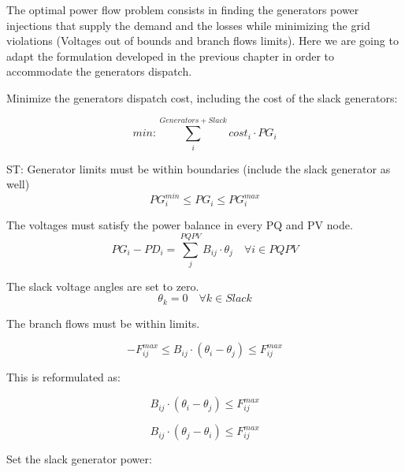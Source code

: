 \documentclass[nols,a4paper,twoside,notoc,fleqn]{tufte-book}
\begin{document}
The optimal power flow problem consists in finding the generators power injections that supply the demand and the losses while minimizing the grid violations (Voltages out of bounds and branch flows limits). Here we are going to adapt the formulation developed in the previous chapter in order to accommodate the generators dispatch.

Minimize the generators dispatch cost, including the cost of the slack generators:

\begin{equation}
min: \sum_i^{Generators+Slack} cost_i \cdot PG_i 
\end{equation}

ST: 
Generator limits must be within boundaries (include the slack generator as well)
\begin{equation}
PG_i^{min} \leq PG_i \leq PG_i^{max}
\end{equation}


The voltages must satisfy the power balance in every PQ and PV node.
\begin{equation}
PG_i - PD_i=\sum_j^{PQPV} B_{ij} \cdot \theta_j  \quad  \forall i \in PQPV
\end{equation}



The slack voltage angles are set to zero.
\begin{equation}
\theta_k=0   \quad \forall k \in Slack
\end{equation}


The branch flows must be within limits.

\begin{equation}
-F_{ij}^{max} \leq B_{ij}⋅(\theta_i - \theta_j) \leq F_{ij}^{max}
\end{equation}


This is reformulated as:

\begin{equation}
 B_{ij}⋅(\theta_i - \theta_j) \leq F_{ij}^{max}
\end{equation}

\begin{equation}
 B_{ij}⋅(\theta_j - \theta_i) \leq F_{ij}^{max}
\end{equation}

Set the slack generator power:
\end{document}
